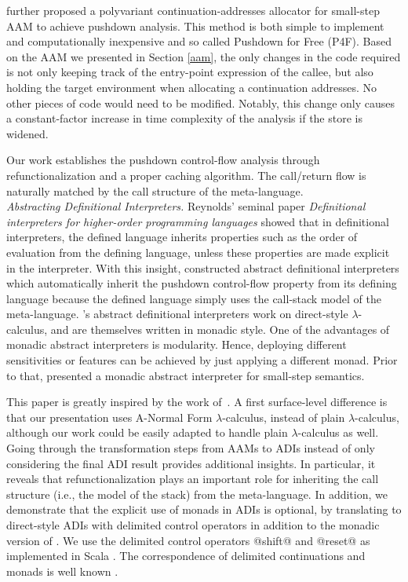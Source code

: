 \documentclass[acmsmall, review]{acmart}\settopmatter{}
\begin{document}
 further proposed a polyvariant continuation-addresses allocator
for small-step AAM to achieve pushdown analysis. This method is both
simple to implement and computationally inexpensive and so called Pushdown for Free (P4F).
Based on the AAM we presented in Section \ref{aam}, the only changes in the code required is not
only keeping track of the entry-point expression of the callee, but also holding the target
environment when allocating a continuation addresses. No other pieces of code would need to be
modified. Notably, this change only causes a constant-factor increase in time complexity of
the analysis if the store is widened.

Our work establishes the pushdown control-flow analysis through refunctionalization and a
proper caching algorithm. The call/return flow is naturally matched by the call structure 
of the meta-language. \\

\textit{Abstracting Definitional Interpreters.}
Reynolds' seminal paper \emph{Definitional interpreters for higher-order programming languages} 
\cite{Reynolds:72, Reynolds:HOSC98-revisited} showed that in definitional interpreters, the
defined language inherits properties such as the order of evaluation from the defining
language, unless these properties are made explicit in the 
interpreter. With this insight,
\citet{darais2017abstracting} constructed abstract definitional interpreters which
automatically inherit the pushdown control-flow property from its defining language because
the defined language simply uses the call-stack model of the meta-language.
\citeauthor{darais2017abstracting}'s abstract definitional interpreters work on direct-style
$\lambda$-calculus, and are themselves written in monadic style. One of the advantages of monadic
abstract interpreters is modularity. Hence, deploying different sensitivities
or features can be achieved by just applying a different monad. Prior to that, \citet{Sergey:2013:MAI:2491956.2491979}
presented a monadic abstract interpreter for small-step semantics.

This paper is greatly inspired by the work of~\citet{darais2017abstracting}.
A first surface-level difference is that our presentation uses A-Normal Form $\lambda$-calculus, 
instead of plain $\lambda$-calculus, although our work could be easily adapted to handle plain 
$\lambda$-calculus as well. Going through the transformation steps from AAMs to ADIs instead of 
only considering the final ADI result provides additional insights. In particular, it reveals that 
refunctionalization plays an important role for inheriting the call structure (i.e., the model of 
the stack) from the meta-language. 
In addition, we demonstrate that the explicit use of monads in ADIs is optional, by translating to
direct-style ADIs with delimited control operators in addition to the monadic version of \citet{darais2017abstracting}. 
We use the delimited control operators @shift@ and @reset@ \cite{Danvy:1990:AC:91556.91622} as implemented in Scala 
\cite{rompf2009implementing}. The correspondence of delimited continuations and monads is well known
\cite{Danvy:1990:AC:91556.91622, wadler1992essence, danvy1992representing, moggi1991notions, filinski1994representing}.
\end{document}
